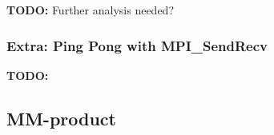 \textbf{TODO: }
Further analysis needed? 

\subsubsection*{Extra: Ping Pong with MPI\_SendRecv}
\textbf{TODO: }

\subsection{MM-product}





